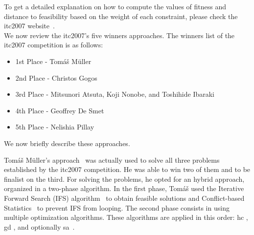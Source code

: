 To get a detailed explanation on how to compute the values of fitness and distance to feasibility based on the weight of each constraint, please check the \gls{itc2007} website~\cite{McCollum2008}.\\


We now review the \gls{itc2007}'s five winners approaches. The winners list of the \gls{itc2007} competition is as follows:
\begin{itemize}
	\item 1st Place - Tom\'{a}\v{s} M\"{u}ller
	\item 2nd Place - Christos Gogos
	\item 3rd Place - Mitsunori Atsuta, Koji Nonobe, and Toshihide Ibaraki
	\item 4th Place - Geoffrey De Smet
	\item 5th Place - Nelishia Pillay
\end{itemize}

We now briefly describe these approaches.

Tom\'{a}\v{s} M\"{u}ller's approach~\cite{Mueller2009} was actually used to solve all three problems established by the \gls{itc2007} competition. He was able to win two of them and to be finalist on the third. For solving the problems, he opted for an hybrid approach, organized in a two-phase algorithm. In the first phase, Tom\'{a}\v{s} used the Iterative Forward Search (IFS) algorithm~\cite{Mueller2005} to obtain feasible solutions and Conflict-based Statistics~\cite{Mueller2004} to prevent IFS from looping. The second phase consists in using multiple optimization algorithms. These algorithms are applied in this order: \gls{hc} \cite{Russell2010}, \gls{gd} \cite{Dueck1993}, and optionally \gls{sa}~\cite{Kirkpatrick1983}.\\


